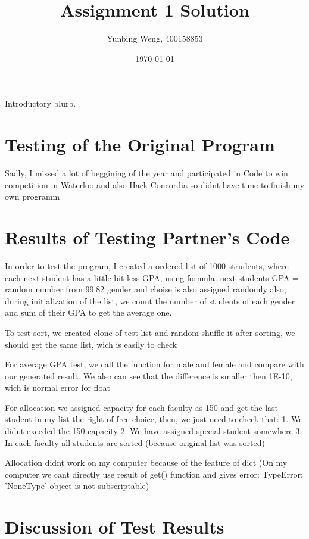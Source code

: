 \documentclass[12pt]{article}
\title{Assignment 1 Solution}
\author{Yunbing Weng, 400158853}
\date{\today}
\begin{document}
\maketitle

Introductory blurb.

\section{Testing of the Original Program}

Sadly, I missed a lot of beggining of the year and participated in Code to win competition
in Waterloo and also Hack Concordia so didnt have time to finish my own programm

\section{Results of Testing Partner's Code}

In order to test the program, I created a ordered list of 1000 strudents, 
where each next student has a little bit less GPA, using formula:
next students GPA = random number from 99.82%
gender and choise is also assigned randomly
also, during initialization of the list, we count the number of students
of each gender and sum of their GPA to get the average one.

To test sort, we created clone of test list and random shuffle it
after sorting, we should get the same list, wich is easily to check

For average GPA test, we call the function for male and female and compare 
with our generated result. We also can see that the difference is smaller then
1E-10, wich is normal error for float

For allocation we assigned capacity for each faculty as 150 and get the last student in my list
the right of free choice, then, we just need to check that:
1. We didnt exeeded the 150 capacity
2. We have assigned special student somewhere
3. In each faculty all students are sorted (because original list was sorted)

Allocation didnt work on my computer because of the feature of dict
(On my computer we cant directly use result of get() function and gives error:
TypeError: 'NoneType' object is not subscriptable)

\section{Discussion of Test Results}
\end{document}
